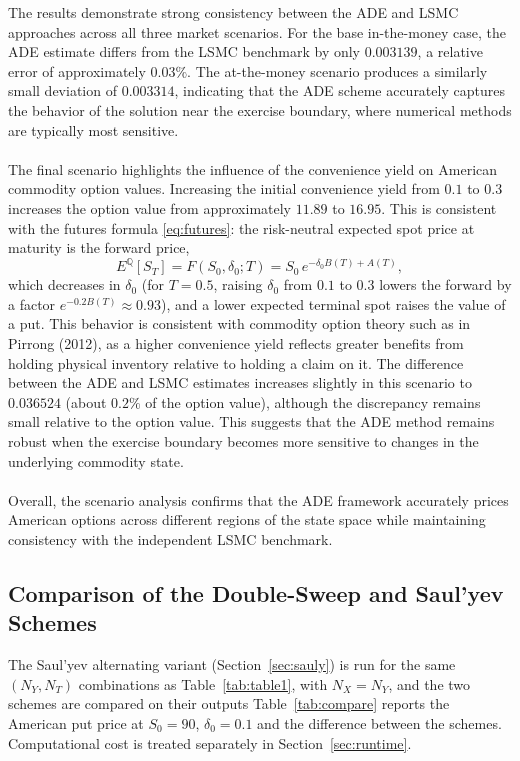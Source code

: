 \documentclass[12pt,a4paper]{article}
\begin{document}
The results demonstrate strong consistency between the ADE and LSMC approaches across all three market scenarios. For the base in-the-money case, the ADE estimate differs from the LSMC benchmark by only $0.003139$, a relative error of approximately $0.03\%$. The at-the-money scenario produces a similarly small deviation of $0.003314$, indicating that the ADE scheme accurately captures the behavior of the solution near the exercise boundary, where numerical methods are typically most sensitive.\\\\
The final scenario highlights the influence of the convenience yield on American commodity option values. Increasing the initial convenience yield from $0.1$ to $0.3$ increases the option value from approximately $11.89$ to $16.95$. This is consistent with the futures formula \eqref{eq:futures}: the risk-neutral expected spot price at maturity is the forward price,
\begin{equation}
E^{\mathbb{Q}}[S_T]=F(S_0,\delta_0;T)=S_0\,e^{-\delta_0B(T)+A(T)},
\end{equation}
which decreases in $\delta_0$ (for $T=0.5$, raising $\delta_0$ from $0.1$ to $0.3$ lowers the forward by a factor $e^{-0.2B(T)}\approx0.93$), and a lower expected terminal spot raises the value of a put. This behavior is consistent with commodity option theory such as in Pirrong (2012), as a higher convenience yield reflects greater benefits from holding physical inventory relative to holding a claim on it. The difference between the ADE and LSMC estimates increases slightly in this scenario to $0.036524$ (about $0.2\%$ of the option value), although the discrepancy remains small relative to the option value. This suggests that the ADE method remains robust when the exercise boundary becomes more sensitive to changes in the underlying commodity state.\\\\
Overall, the scenario analysis confirms that the ADE framework accurately prices American options across different regions of the state space while maintaining consistency with the independent LSMC benchmark.

\subsection{Comparison of the Double-Sweep and Saul'yev Schemes}\label{sec:compare}
 
The Saul'yev alternating variant (Section~\ref{sec:sauly}) is run for the same $(N_Y,N_T)$ combinations as Table~\ref{tab:table1}, with $N_X=N_Y$, and the two schemes are compared on their outputs  Table~\ref{tab:compare} reports the American put price at $S_0=90$, $\delta_0=0.1$ and the difference between the schemes. Computational cost is treated separately in Section~\ref{sec:runtime}.
 
\end{document}
